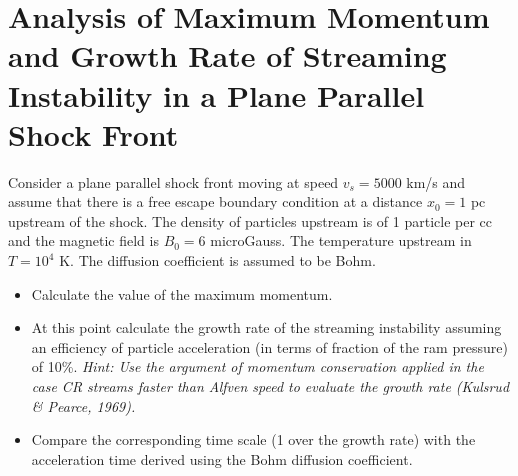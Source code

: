 \section{Analysis of Maximum Momentum and Growth Rate of Streaming Instability in a Plane Parallel Shock Front}

Consider a plane parallel shock front moving at speed \( v_s=5000 \) km/s and assume that there is a
free escape boundary condition at a distance \( x_0 = 1 \) pc upstream of the shock. The density of particles upstream is of 1 particle per cc and the magnetic field is \( B_0=6 \) microGauss. The
temperature upstream in \( T=10^4 \) K. The diffusion coefficient is assumed to be Bohm. 

\begin{itemize}
\item Calculate the value of the maximum momentum. 
\item At this point calculate the growth rate of the streaming instability assuming an efficiency of particle acceleration (in terms of fraction of the ram pressure) of 10\%. \emph{Hint: Use the argument of momentum conservation applied in the case CR streams faster than Alfven speed to evaluate the growth rate (Kulsrud \& Pearce, 1969).}
\item Compare the corresponding time scale (1 over the growth rate) with the acceleration time derived using the Bohm diffusion coefficient.
\end{itemize}
